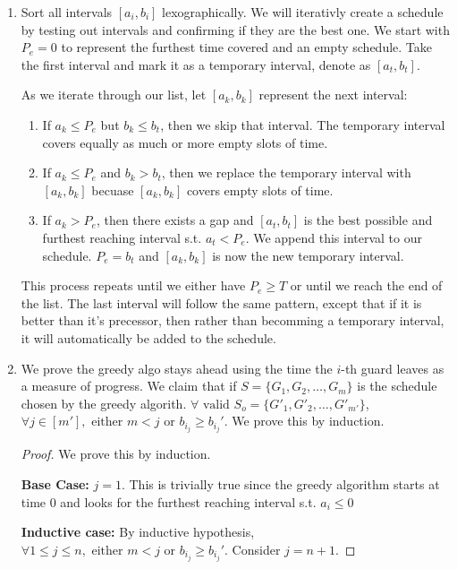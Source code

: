 \documentclass[12pt]{article}
\begin{document}
\begin{enumerate}
  \item[a)] Sort all intervals $[a_i, b_i]$ lexographically. We will iterativly create a schedule by testing out intervals and confirming if they are the best one. We start with $P_e = 0$ to represent the furthest time covered and an empty schedule. Take the first interval and mark it as a temporary interval, denote as $[a_t, b_t]$.
  
  As we iterate through our list, let $[a_k, b_k]$ represent the next interval:
  \begin{enumerate}
    \item If $a_k \leq P_e$ but $b_k \leq b_t$, then we skip that interval. The temporary interval covers equally as much or more empty slots of time. 
    \item If $a_k \leq P_e$ and $b_k > b_t$, then we replace the temporary interval with $[a_k, b_k]$ becuase $[a_k, b_k]$ covers empty slots of time. 
    \item If $a_k >P_e$, then there exists a gap and $[a_t, b_t]$ is the best possible and furthest reaching interval s.t. $a_t < P_e$. We append this interval to our schedule. $P_e = b_t$ and $[a_k, b_k]$ is now the new temporary interval.
  \end{enumerate}
  
  This process repeats until we either have $P_e \geq T$ or until we reach the end of the list. The last interval will follow the same pattern, except that if it is better than it's precessor, then rather than becomming a temporary interval, it will automatically be added to the schedule.

\item[b)] We prove the greedy algo stays ahead using the time the $i$-th guard leaves as a measure of progress. We claim that if $S = \{G_1, G_2, \dots, G_m\}$ is the schedule chosen by the greedy algorith. $\forall \text{ valid } S_o = \{G'_1, G'_2, \dots, G'_{m'}\}$, $\forall j \in [m'], \text{ either } m < j \text{ or } b_{i_j} \geq b_{i_j}'$. We prove this by induction.

\begin{proof} We prove this by induction.

  \textbf{Base Case:} $j = 1$. This is trivially true since the greedy algorithm starts at time 0 and looks for the furthest reaching interval s.t. $a_i \leq 0$

  \textbf{Inductive case:} By inductive hypothesis, $\forall 1 \leq j \leq n, \text{ either } m < j \text{ or } b_{i_j} \geq b_{i_j}'$. Consider $j = n + 1$.


\end{proof}
\end{enumerate}
\end{document}

